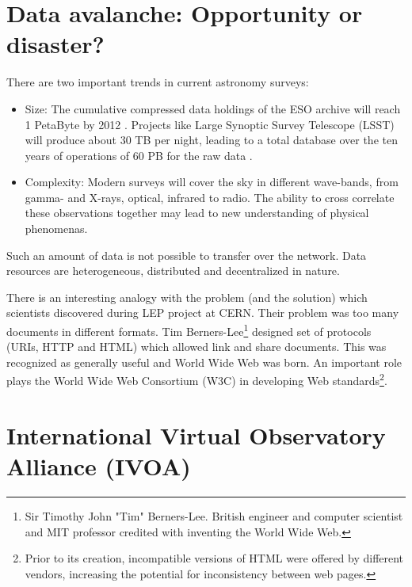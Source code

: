 \section{ Data avalanche: Opportunity or disaster?}

There are two important trends in current astronomy surveys:

\begin{itemize}

  \item{Size:} The cumulative compressed data holdings of the ESO archive will
    reach 1 PetaByte by 2012 \cite{hanisch2010international}. Projects
    like Large Synoptic Survey Telescope (LSST) will produce about 30
    TB per night, leading to a total database over the ten years of
    operations of 60 PB for the raw data \cite{becla2006designing}.
   
  \item{Complexity:} Modern surveys will cover the sky in different
    wave-bands, from gamma- and X-rays, optical, infrared to
    radio. The ability to cross correlate these observations together
    may lead to new understanding of physical
    phenomenas. \cite{hanisch2010international}
\end{itemize}



Such an amount of data is not possible to transfer over the
network. Data resources are heterogeneous, distributed and
decentralized in nature.


There is an interesting analogy with the problem (and the solution)
which scientists discovered during LEP project at CERN.  Their problem
was too many documents in different formats. Tim Berners-Lee\footnote{
  Sir Timothy John "Tim" Berners-Lee. British engineer and computer
  scientist and MIT professor credited with inventing the World Wide
  Web.} designed set of protocols (URIs, HTTP and HTML) which allowed
link and share documents\cite{berners1990worldwideweb}. This was
recognized as generally useful and World Wide Web was born. An
important role plays the World Wide Web Consortium (W3C) in developing
Web standards\footnote{Prior to its creation, incompatible versions of
  HTML were offered by different vendors, increasing the potential for
  inconsistency between web pages.}.
    
    
\section{International Virtual Observatory Alliance (IVOA)}

